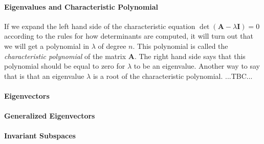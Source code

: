 \paragraph{Eigenvalues and Characteristic Polynomial}
If we expand the left hand side of the characteristic equation $\det ( \mathbf{A} - \lambda \mathbf{I} ) = 0$ according to the rules for how determinants are computed, it will turn out that we will get a polynomial in $\lambda$ of degree $n$. This polynomial is called the \emph{characteristic polynomial} of the matrix  $\mathbf{A}$. The right hand side says that this polynomial should be equal to zero for $\lambda$ to be an eigenvalue. Another way to say that is that an eigenvalue $\lambda$ is a root of the characteristic polynomial. ...TBC...



\paragraph{Eigenvectors}

\paragraph{Generalized Eigenvectors}

\paragraph{Invariant Subspaces}



